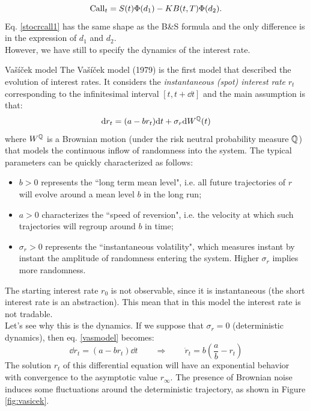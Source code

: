 \begin{equation}\label{stocrcall1}
    \operatorname{Call}_t = S(t)\Phi(d_1) - KB(t,T)\Phi(d_2).
\end{equation}
Eq. \eqref{stocrcall1} has the same shape as the B\&S formula and the only difference is in the expression of $d_1$ and $d_2$.\\ However, we have still to specify the dynamics of the interest rate. %
\begin{example}{Vašíček model}{}{}
    The Vašíček model (1979) is the first model that described the evolution of interest rates. It considers the \emph{instantaneous (spot) interest rate} $r_t$ corresponding to the infinitesimal interval $[t,t+\dd t]$ and the main assumption is that:
    \begin{equation}\label{vasmodel}
        \dd r_t = (a-br_t)\dd t + \sigma_r\dd W^{\mathbb{Q}}(t)
    \end{equation}
    where $W^{\mathbb{Q}}$ is a Brownian motion (under the risk neutral probability measure $\mathbb{Q}$) that models the continuous inflow of randomness into the system. The typical parameters can be quickly characterized as follows:
    \begin{itemize}
        \item $b>0$ represents the ``long term mean level", i.e. all future trajectories of $r$ will evolve around a mean level $b$ in the long run;
        \item $a>0$ characterizes the ``speed of reversion", i.e.  the velocity at which such trajectories will regroup around $b$ in time;
        \item $\sigma_r>0$ represents the ``instantaneous volatility", which measures instant by instant the amplitude of randomness entering the system. Higher $\sigma_r$ implies more randomness.
    \end{itemize}
    The starting interest rate $r_0$ is not observable, since it is instantaneous (the short interest rate is an abstraction). This mean that in this model the interest rate is not tradable.\\
    Let's see why this is the dynamics. If we suppose that $\sigma_r=0$ (deterministic dynamics), then eq. \eqref{vasmodel} becomes:
    \begin{equation}\label{rdyn}
        \dd r_t = (a-br_t)\dd t \qquad\Rightarrow\qquad \Dot{r}_t = b\left(\frac{a}{b}-r_t\right)
    \end{equation}
    The solution $r_t$ of this differential equation will have an exponential behavior with convergence to the asymptotic value $r_{\infty}$. The presence of Brownian noise induces some fluctuations around the deterministic trajectory, as shown in Figure \ref{fig:vasicek}.

\end{example}
